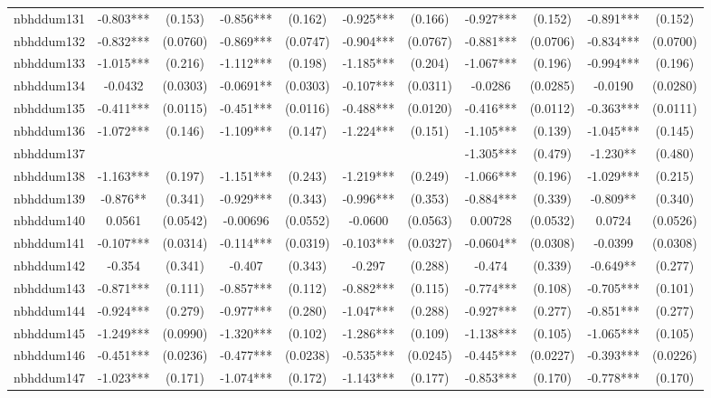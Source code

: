 \documentclass[]{article}
\begin{document}
\begin{tabular}{lcccccccccc}
nbhddum131 & -0.803*** & (0.153) & -0.856*** & (0.162) & -0.925*** & (0.166) & -0.927*** & (0.152) & -0.891*** & (0.152) \\
nbhddum132 & -0.832*** & (0.0760) & -0.869*** & (0.0747) & -0.904*** & (0.0767) & -0.881*** & (0.0706) & -0.834*** & (0.0700) \\
nbhddum133 & -1.015*** & (0.216) & -1.112*** & (0.198) & -1.185*** & (0.204) & -1.067*** & (0.196) & -0.994*** & (0.196) \\
nbhddum134 & -0.0432 & (0.0303) & -0.0691** & (0.0303) & -0.107*** & (0.0311) & -0.0286 & (0.0285) & -0.0190 & (0.0280) \\
nbhddum135 & -0.411*** & (0.0115) & -0.451*** & (0.0116) & -0.488*** & (0.0120) & -0.416*** & (0.0112) & -0.363*** & (0.0111) \\
nbhddum136 & -1.072*** & (0.146) & -1.109*** & (0.147) & -1.224*** & (0.151) & -1.105*** & (0.139) & -1.045*** & (0.145) \\
nbhddum137 &  &  &  &  &  &  & -1.305*** & (0.479) & -1.230** & (0.480) \\
nbhddum138 & -1.163*** & (0.197) & -1.151*** & (0.243) & -1.219*** & (0.249) & -1.066*** & (0.196) & -1.029*** & (0.215) \\
nbhddum139 & -0.876** & (0.341) & -0.929*** & (0.343) & -0.996*** & (0.353) & -0.884*** & (0.339) & -0.809** & (0.340) \\
nbhddum140 & 0.0561 & (0.0542) & -0.00696 & (0.0552) & -0.0600 & (0.0563) & 0.00728 & (0.0532) & 0.0724 & (0.0526) \\
nbhddum141 & -0.107*** & (0.0314) & -0.114*** & (0.0319) & -0.103*** & (0.0327) & -0.0604** & (0.0308) & -0.0399 & (0.0308) \\
nbhddum142 & -0.354 & (0.341) & -0.407 & (0.343) & -0.297 & (0.288) & -0.474 & (0.339) & -0.649** & (0.277) \\
nbhddum143 & -0.871*** & (0.111) & -0.857*** & (0.112) & -0.882*** & (0.115) & -0.774*** & (0.108) & -0.705*** & (0.101) \\
nbhddum144 & -0.924*** & (0.279) & -0.977*** & (0.280) & -1.047*** & (0.288) & -0.927*** & (0.277) & -0.851*** & (0.277) \\
nbhddum145 & -1.249*** & (0.0990) & -1.320*** & (0.102) & -1.286*** & (0.109) & -1.138*** & (0.105) & -1.065*** & (0.105) \\
nbhddum146 & -0.451*** & (0.0236) & -0.477*** & (0.0238) & -0.535*** & (0.0245) & -0.445*** & (0.0227) & -0.393*** & (0.0226) \\
nbhddum147 & -1.023*** & (0.171) & -1.074*** & (0.172) & -1.143*** & (0.177) & -0.853*** & (0.170) & -0.778*** & (0.170) \\

\end{tabular}
\end{document}
